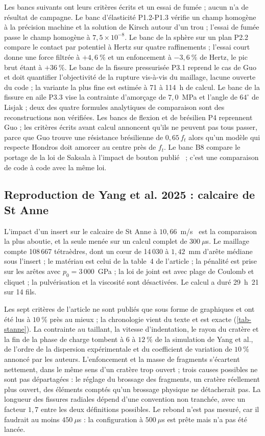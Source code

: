 Les bancs suivants ont leurs critères écrits et un essai de fumée ; aucun n'a de résultat de campagne. Le banc d'élasticité P1.2-P1.3 vérifie un champ homogène à la précision machine et la solution de Kirsch autour d'un trou ; l'essai de fumée passe le champ homogène à $7{,}5\times10^{-8}$. Le banc de la sphère sur un plan P2.2 compare le contact par potentiel à Hertz sur quatre raffinements ; l'essai court donne une force filtrée à $+4{,}6~\%$ et un enfoncement à $-3{,}6~\%$ de Hertz, le pic brut étant à $+36~\%$. Le banc de la fissure pressurisée P3.1 reprend le cas de Guo et doit quantifier l'objectivité de la rupture vis-à-vis du maillage, lacune ouverte du code ; la variante la plus fine est estimée à 71 à 114~h de calcul. Le banc de la fissure en aile P3.3 vise la contrainte d'amorçage de $7{,}0$~MPa et l'angle de $64^\circ$ de Lisjak ; deux des quatre formules analytiques de comparaison sont des reconstructions non vérifiées. Les bancs de flexion et de brésilien P4 reprennent Guo ; les critères écrits avant calcul annoncent qu'ils ne peuvent pas tous passer, parce que Guo trouve une résistance brésilienne de $0{,}65\,f_t$ alors qu'un modèle qui respecte Hondros doit amorcer au centre près de $f_t$. Le banc B8 compare le portage de la loi de Saksala à l'impact de bouton publié~\cite{saksala2011ijnamg} ; c'est une comparaison de code à code avec la même loi.

\subsection{Reproduction de Yang et al. 2025 : calcaire de St Anne}
\label{sec-stanne}

L'impact d'un insert sur le calcaire de St Anne à $10{,}66$~m/s~\cite{yang2025validation} est la comparaison la plus aboutie, et la seule menée sur un calcul complet de $300~\mu$s. Le maillage compte 108\,667 tétraèdres, dont un cœur de 14\,030 à $1{,}42$~mm d'arête médiane sous l'insert ; le matériau est celui de la table~4 de l'article ; la pénalité est prise sur les arêtes avec $p_0 = 3\,000$~GPa ; la loi de joint est  avec plage de Coulomb et cliquet ; la pulvérisation et la viscosité sont désactivées. Le calcul a duré 29~h~21 sur 14 fils.

Les sept critères de l'article ne sont publiés que sous forme de graphiques et ont été lus à $10~\%$ près au mieux ; la chronologie vient du texte et est exacte (\cref{tab-stanne}). La contrainte au taillant, la vitesse d'indentation, le rayon du cratère et la fin de la phase de charge tombent à 6 à $12~\%$ de la simulation de Yang et al., de l'ordre de la dispersion expérimentale et du coefficient de variation de $10~\%$ annoncé par les auteurs. L'enfoncement et la masse de fragments s'écartent nettement, dans le même sens d'un cratère trop ouvert ; trois causes possibles ne sont pas départagées : le réglage du brossage des fragments, un cratère réellement plus ouvert, des éléments comptés qu'un brossage physique ne détacherait pas. La longueur des fissures radiales dépend d'une convention non tranchée, avec un facteur $1{,}7$ entre les deux définitions possibles. Le rebond n'est pas mesuré, car il faudrait au moins $450~\mu$s : la configuration à $500~\mu$s est prête mais n'a pas été lancée.

